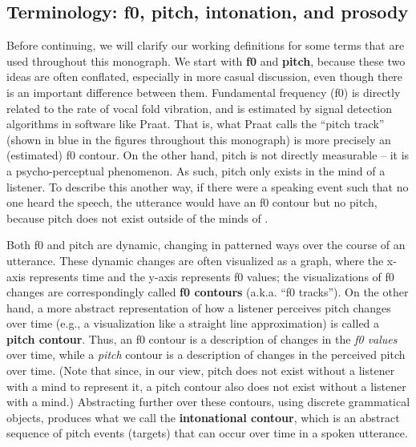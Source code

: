 \subsection{Terminology: f0, pitch, intonation, and prosody}\label{sec:terminology}

Before continuing, we will clarify our working definitions for some terms that are used throughout this monograph. We start with \textbf{f0} and \textbf{pitch}, because these two ideas are often conflated, especially in more casual discussion, even though there is an important difference between them. Fundamental frequency (f0) \DIFaddbegin {}\DIFaddend is directly related to the rate of vocal fold vibration, and is estimated by signal detection algorithms in software like Praat. That is, what Praat calls the “pitch track” (shown in blue in the figures throughout this monograph) is more precisely an (estimated) f0 contour. On the other hand, pitch is not directly measurable – it is a psycho-perceptual phenomenon. As such, pitch only exists in the mind of a listener. To describe this another way, if there were a speaking event such that no one heard the speech, the utterance would have an f0 contour but no pitch, because pitch does not exist outside of the minds of \DIFdelbegin {}\DIFdelend \DIFaddbegin {}\DIFaddend .

Both f0 and pitch are dynamic, changing in patterned ways over the course of an utterance. These dynamic changes are often visualized as a graph, where the x-axis represents time and the y-axis represents f0 values; the visualizations of f0 changes are correspondingly called \textbf{f0 contours} (a.k.a. “f0 tracks”). On the other hand, a more abstract representation of how a listener perceives pitch changes over time (e.g., a visualization like a straight line approximation) is called a \textbf{pitch contour}. Thus, an f0 contour is a description of changes in the \emph{f0 values} over time, while a \emph{pitch} contour is a description of changes in the perceived pitch over time. (Note that since, in our view, pitch does not exist without a listener with a mind to represent it, a pitch contour also does not exist without a listener with a mind.) Abstracting further over these contours, using discrete grammatical objects, produces what we call the \textbf{intonational contour}, which is an abstract sequence of pitch events (targets) that can occur over time in a spoken utterance.

